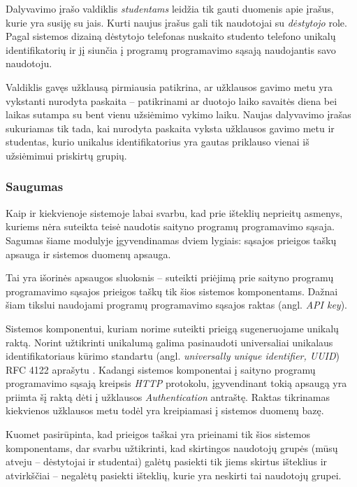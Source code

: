 \documentclass{VUMIFPSkursinis}
\begin{document}

Dalyvavimo įrašo valdiklis \textit{studentams} leidžia tik gauti duomenis apie įrašus, kurie yra susiję su jais. Kurti naujus įrašus gali tik naudotojai su \textit{dėstytojo} role. Pagal sistemos dizainą dėstytojo telefonas nuskaito studento telefono unikalų identifikatorių ir jį siunčia į programų programavimo sąsają naudojantis savo naudotoju.

Valdiklis gavęs užklausą pirmiausia patikrina, ar užklausos gavimo metu yra vykstanti nurodyta paskaita – patikrinami ar duotojo laiko savaitės diena bei laikas sutampa su bent vienu užsiėmimo vykimo laiku. Naujas dalyvavimo įrašas sukuriamas tik tada, kai nurodyta paskaita vyksta užklausos gavimo metu ir studentas, kurio unikalus identifikatorius yra gautas priklauso vienai iš užsiėmimui priskirtų grupių.

\subsubsection{Saugumas}

Kaip ir kiekvienoje sistemoje labai svarbu, kad prie išteklių neprieitų asmenys, kuriems nėra suteikta teisė naudotis saityno programų programavimo sąsaja. Sagumas šiame modulyje įgyvendinamas dviem lygiais: sąsajos prieigos taškų apsauga ir sistemos duomenų apsauga.

 \label{apiKeySecurity}

Tai yra išorinės apsaugos sluoksnis – suteikti priėjimą prie saityno programų programavimo sąsajos prieigos taškų tik šios sistemos komponentams. Dažnai šiam tikslui naudojami programų programavimo sąsajos raktas (angl. \textit{API key}).

Sistemos komponentui, kuriam norime suteikti prieigą sugeneruojame unikalų raktą. Norint užtikrinti unikalumą galima pasinaudoti universaliai unikalaus identifikatoriaus kūrimo standartu (angl. \textit{universally unique identifier, UUID}) RFC 4122 aprašytu \cite{uuidRef}. Kadangi sistemos komponentai į saityno programų programavimo sąsają kreipsis \textit{HTTP} protokolu, įgyvendinant tokią apsaugą yra priimta šį raktą dėti į užklausos \textit{Authentication} antraštę. Raktas tikrinamas kiekvienos užklausos metu todėl yra kreipiamasi į sistemos duomenų bazę.


Kuomet pasirūpinta, kad prieigos taškai yra prieinami tik šios sistemos komponentams, dar svarbu užtikrinti, kad skirtingos naudotojų grupės (mūsų atveju – dėstytojai ir studentai) galėtų pasiekti tik jiems skirtus išteklius ir atvirkščiai – negalėtų pasiekti išteklių, kurie yra neskirti tai naudotojų grupei.
\end{document}
